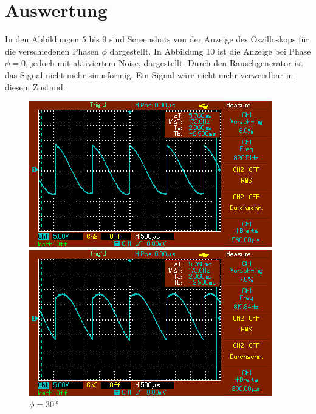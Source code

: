 \section{Auswertung}
\label{sec:Auswertung}

\begin{table}
    \centering
    
\end{table}
In den Abbildungen 5 bis 9 sind Screenshots von der Anzeige des Oszilloskops für die verschiedenen Phasen $\phi$ dargestellt. In Abbildung 10 ist
die Anzeige bei Phase $\phi = 0$, jedoch mit aktiviertem Noise, dargestellt. Durch den Rauschgenerator ist das Signal nicht mehr sinusförmig. Ein Signal wäre nicht mehr verwendbar in diesem Zustand.\\
\begin{figure}
    \begin{minipage}[b]{.45\linewidth} %
       \includegraphics[width=\linewidth]{bilder/MAP003.png}
       \caption{$\phi = 0\,\unit{°}$}
    \end{minipage}
    \hspace{0.1\linewidth}%
    \begin{minipage}[b]{.45\linewidth} %
       \includegraphics[width=\linewidth]{bilder/MAP004.png}
       \caption{$\phi = 30\,\unit{°}$}
    \end{minipage}
\end{figure}

